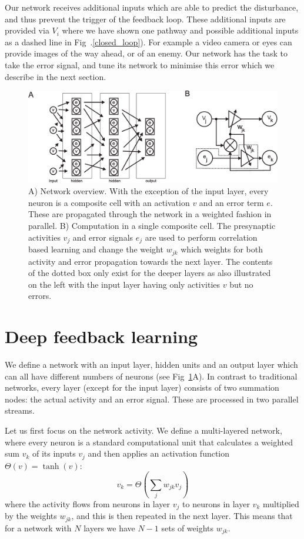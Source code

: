 \documentclass{article}
\begin{document}
Our network receives additional inputs which are able to predict the
disturbance, and thus prevent the trigger of the feedback loop. These
additional inputs are provided via $V_i$ where we have shown one
pathway and possible additional inputs as a dashed line in
Fig~.\ref{closed_loop}).
For example a video camera or eyes can provide images of the way ahead,
or of an enemy. Our network has the task to take the error
signal, and tune its network to minimise this error which we describe
in the next section.

\begin{figure}[!ht]
  \centering
  \includegraphics[width=\columnwidth]{netw_together}
  \caption{A) Network overview. With the exception of the input layer, every
    neuron is a composite cell with an activation $v$ and an error
    term $e$. These are propagated through the network in a weighted
    fashion in parallel.  B) Computation in a single composite cell.
    The presynaptic activities $v_j$ and error signals $e_j$ are used
    to perform correlation based learning and change the weight
    $w_{jk}$ which weights for both activity and error propagation towards the next
    layer. The contents of the dotted box only exist for the deeper
    layers as also illustrated on the left with the input layer
    having only activities $v$ but no errors. \label{netw_together}}
\end{figure}


\section{Deep feedback learning}
We define a network with an input layer, hidden units and an output
layer which can all have different numbers of neurons (see
Fig~\ref{netw_together}A). In contrast to traditional
networks, every layer (except for the input layer) consists of two
summation nodes: the actual activity and an error signal. These
are processed in two parallel streams.

Let us first focus on the network activity. We define a multi-layered
network, where every neuron is a standard computational unit that
calculates a weighted sum $v_k$ of its inputs $v_j$ and then applies
an activation function $\Theta(v) = \tanh(v)$:
\begin{equation}
  v_k = \Theta\left( \sum_j w_{jk} v_{j} \right) \label{act_sum}
\end{equation}
where the activity flows from neurons in layer $v_j$ to neurons in
layer $v_k$ multiplied by the weights $w_{jk}$, and this
is then repeated in the next layer. This means that for a network with
$N$ layers we have $N-1$ sets of weights $w_{jk}$.
\end{document}
